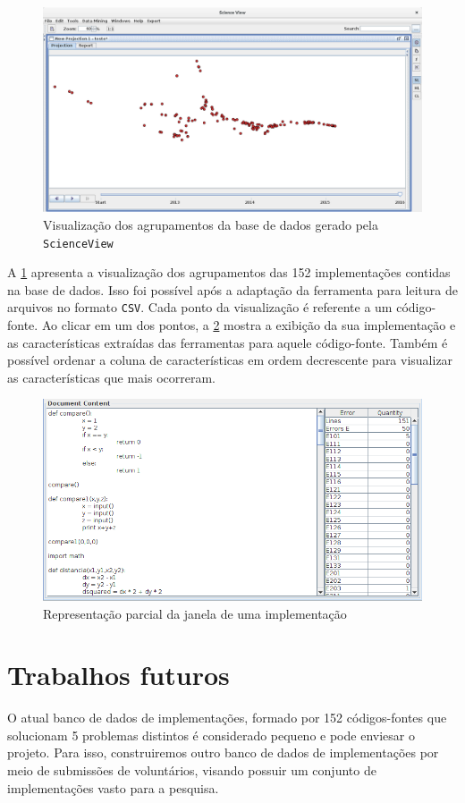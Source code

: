 	\begin{figure}[h]
		\centering
		\includegraphics[width=0.7\linewidth]{imagem/projecaoFinal}
		\caption{Visualização dos agrupamentos da base de dados gerado pela \texttt{ScienceView}}
		\label{fig:projecaoFinal}
	\end{figure}
	
	A \cref{fig:projecaoFinal} apresenta a visualização dos agrupamentos das 152
	implementações contidas na base de dados. Isso foi possível após a adaptação da
	ferramenta para leitura de arquivos no formato \texttt{CSV}. Cada ponto da
	visualização é referente a um código-fonte. Ao clicar em um dos pontos, a
	\cref{fig:scienceViewCodigoFonte} mostra a exibição da sua implementação e
	as características extraídas das ferramentas para aquele código-fonte. Também
	é possível ordenar a coluna de características  em ordem
	decrescente para visualizar as características que mais ocorreram. 
	
	\begin{figure}
		\centering
		\includegraphics[width=0.7\linewidth]{imagem/scienceViewCodigoFonte}
		\caption{Representação parcial da janela de uma implementação}
		\label{fig:scienceViewCodigoFonte}
	\end{figure}

	\section{Trabalhos futuros}
	
		O atual banco de dados de implementações, formado por 152 códigos-fontes que
		solucionam 5 problemas distintos é considerado pequeno e pode enviesar o
		projeto. Para isso, construiremos outro banco de dados de implementações
		por meio de submissões de voluntários, visando possuir um conjunto de
		implementações vasto para a pesquisa.